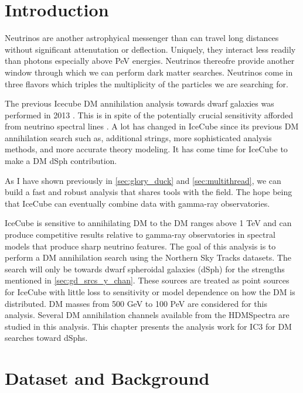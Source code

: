 \section{Introduction} \label{sec:icDM_intro}

Neutrinos are another astrophyical messenger than can travel long distances without significant attenutation or deflection.
Uniquely, they interact less readily than photons especially above PeV energies.
Neutrinos thereofre provide another window through which we can perform dark matter searches.
Neutrinos come in three flavors which triples the multiplicity of the particles we are searching for.

The previous Icecube DM annihilation analysis towards dwarf galaxies was performed in 2013 \cite{IC3_DM2013}.
This is in spite of the potentially crucial sensitivity afforded from neutrino spectral lines \cite{IC3_DM_DanHooper}.
A lot has changed in IceCube since its previous DM annihilation search such as, additional strings, more sophisticated analysis methods, and more accurate theory modeling.
It has come time for IceCube to make a DM dSph contribution.

As I have shown previously in \cref{sec:glory_duck} and \cref{sec:multithread}, we can build a fast and robust analysis that shares tools with the field.
The hope being that IceCube can eventually combine data with gamma-ray observatories.

IceCube is sensitive to annihilating DM to the DM ranges above 1 TeV and can produce competitive results relative to gamma-ray observatories in spectral models that produce sharp neutrino features.
The goal of this analysis is to perform a DM annihilation search using the Northern Sky Tracks datasets.
The search will only be towards dwarf spheroidal galaxies (dSph) for the strengths mentioned in \cref{sec:gd_srcs_y_chan}.
These sources are treated as point sources for IceCube with little loss to sensitivity or model dependence on how the DM is distributed.
DM masses from 500 GeV to 100 PeV are considered for this analysis.
Several DM annihilation channels available from the HDMSpectra are studied in this analysis.
This chapter presents the analysis work for IC3 for DM searches toward dSphs.

\section{Dataset and Background}\label{sec:icDM_databgd}

